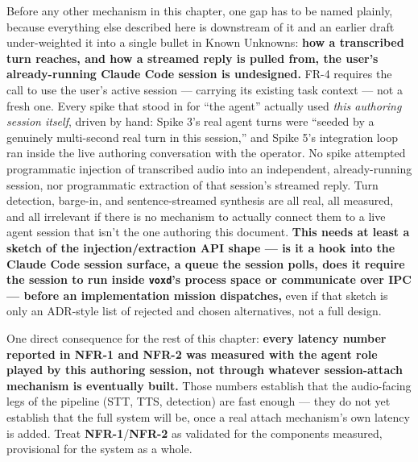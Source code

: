 \documentclass[a4paper,11pt]{report}
\newcommand{\nfr}[1]{\textbf{NFR-#1}}
\begin{document}
Before any other mechanism in this chapter, one gap has to be named
plainly, because everything else described here is downstream of it and
an earlier draft under-weighted it into a single bullet in Known
Unknowns: \textbf{how a transcribed turn reaches, and how a streamed
reply is pulled from, the user's already-running Claude Code session is
undesigned.} FR-4 requires the call to use the user's active
session --- carrying its existing task context --- not a fresh one. Every
spike that stood in for ``the agent'' actually used \emph{this authoring
session itself}, driven by hand: Spike 3's real agent turns were ``seeded
by a genuinely multi-second real turn in this session,'' and Spike 5's
integration loop ran inside the live authoring conversation with the
operator. No spike attempted programmatic injection of transcribed audio
into an independent, already-running session, nor programmatic extraction
of that session's streamed reply. Turn detection, barge-in, and
sentence-streamed synthesis are all real, all measured, and all
irrelevant if there is no mechanism to actually connect them to a live
agent session that isn't the one authoring this document. \textbf{This
needs at least a sketch of the injection/extraction API shape --- is it a
hook into the Claude Code session surface, a queue the session polls,
does it require the session to run inside \texttt{voxd}'s process space
or communicate over IPC --- before an implementation mission dispatches,}
even if that sketch is only an ADR-style list of rejected and chosen
alternatives, not a full design.

One direct consequence for the rest of this chapter: \textbf{every
latency number reported in \nfr{1} and \nfr{2} was measured with the
agent role played by this authoring session, not through whatever
session-attach mechanism is eventually built.} Those numbers establish
that the audio-facing legs of the pipeline (STT, TTS, detection) are fast
enough --- they do not yet establish that the full system will be, once a
real attach mechanism's own latency is added. Treat \nfr{1}/\nfr{2} as
validated for the components measured, provisional for the system as a
whole.
\end{document}
